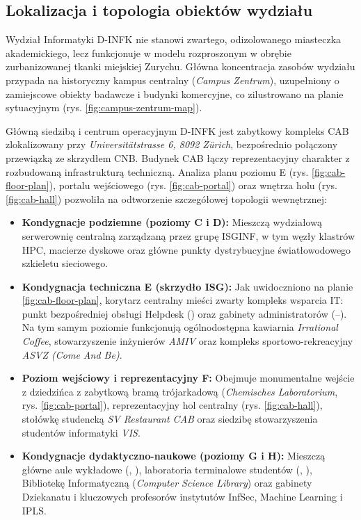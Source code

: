 \subsection{Lokalizacja i topologia obiektów wydziału}\label{subsec:budynki}

Wydział Informatyki D-INFK nie stanowi zwartego, odizolowanego miasteczka akademickiego, lecz funkcjonuje w modelu rozproszonym w obrębie zurbanizowanej tkanki miejskiej Zurychu. Główna koncentracja zasobów wydziału przypada na historyczny kampus centralny (\textit{Campus Zentrum}), uzupełniony o zamiejscowe obiekty badawcze i budynki komercyjne, co zilustrowano na planie sytuacyjnym (rys. \ref{fig:campus-zentrum-map}).



Główną siedzibą i centrum operacyjnym D-INFK jest zabytkowy kompleks CAB zlokalizowany przy \textit{Universitätstrasse 6, 8092 Zürich}, bezpośrednio połączony przewiązką ze skrzydłem CNB. Budynek CAB łączy reprezentacyjny charakter z rozbudowaną infrastrukturą techniczną. Analiza planu poziomu E (rys. \ref{fig:cab-floor-plan}), portalu wejściowego (rys. \ref{fig:cab-portal}) oraz wnętrza holu (rys. \ref{fig:cab-hall}) pozwoliła na odtworzenie szczegółowej topologii wewnętrznej:
\begin{itemize}
    \item \textbf{Kondygnacje podziemne (poziomy C i D):} Mieszczą wydziałową serwerownię centralną zarządzaną przez grupę ISGINF, w tym węzły klastrów HPC, macierze dyskowe oraz główne punkty dystrybucyjne światłowodowego szkieletu sieciowego.
    \item \textbf{Kondygnacja techniczna E (skrzydło ISG):} Jak uwidoczniono na planie \ref{fig:cab-floor-plan}, korytarz centralny mieści zwarty kompleks wsparcia IT: punkt bezpośredniej obsługi Helpdesk () oraz gabinety administratorów (--). Na tym samym poziomie funkcjonują ogólnodostępna kawiarnia \textit{Irrational Coffee}, stowarzyszenie inżynierów \textit{AMIV} oraz kompleks sportowo-rekreacyjny \textit{ASVZ (Come And Be)}.
    \item \textbf{Poziom wejściowy i reprezentacyjny F:} Obejmuje monumentalne wejście z dziedzińca z zabytkową bramą trójarkadową (\textit{Chemisches Laboratorium}, rys. \ref{fig:cab-portal}), reprezentacyjny hol centralny (rys. \ref{fig:cab-hall}), stołówkę studencką \textit{SV Restaurant CAB} oraz siedzibę stowarzyszenia studentów informatyki \textit{VIS}.
    \item \textbf{Kondygnacje dydaktyczno-naukowe (poziomy G i H):} Mieszczą główne aule wykładowe (, ), laboratoria terminalowe studentów (, ), Bibliotekę Informatyczną (\textit{Computer Science Library}) oraz gabinety Dziekanatu i kluczowych profesorów instytutów InfSec, Machine Learning i IPLS.
\end{itemize}

